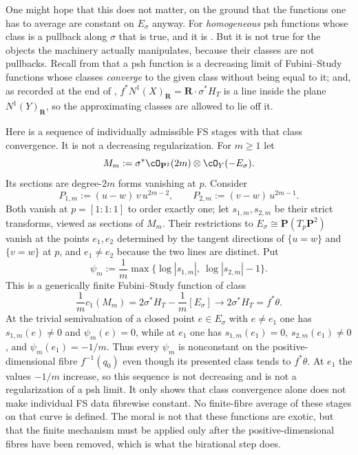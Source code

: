 \begin{example}
One might hope that this does not matter, on the ground that the functions
one has to average are constant on $E_\sigma$ anyway.  For
\emph{homogeneous} psh functions whose class is a pullback along $\sigma$
that is true, and it is .  But it is not true
for the objects the machinery actually manipulates, because their classes
are not pullbacks.  Recall from  that a psh function is a
decreasing limit of Fubini--Study functions whose classes \emph{converge} to
the given class without being equal to it; and, as recorded at the end of
, $f^*N^1(X)_{\mathbf R}=\mathbf R\cdot\sigma^*H_T$
is a line inside the plane $N^1(Y)_{\mathbf R}$, so the approximating
classes are allowed to lie off it.

Here is a sequence of individually admissible FS stages with that
class convergence.  It is not a decreasing regularization.  For $m\ge1$
let
\[
 M_m:=\sigma^*\cO_{\mathbf P^2}(2m)\otimes\cO_Y(-E_\sigma).
\]
Its sections are degree-$2m$ forms vanishing at $p$.  Consider
\[
 P_{1,m}:=(u-w)\,v\,u^{2m-2},
 \qquad
 P_{2,m}:=(v-w)\,u^{2m-1}.
\]
Both vanish at $p=[1:1:1]$ to order exactly one; let $s_{1,m},s_{2,m}$ be
their strict transforms, viewed as sections of $M_m$.  Their
restrictions to $E_\sigma\cong\mathbf P(T_p\mathbf P^2)$ vanish at the
points $e_1,e_2$ determined by the tangent directions of $\{u=w\}$ and
$\{v=w\}$ at $p$, and $e_1\ne e_2$ because the two lines are distinct.
Put
\[
 \psi_m:=\frac1m\max\bigl\{\log|s_{1,m}|,\
                              \log|s_{2,m}|-1\bigr\}.
\]
This is a generically finite Fubini--Study function of class
\[
 \frac1m c_1(M_m)=2\sigma^*H_T-\frac1m[E_\sigma]
 \longrightarrow 2\sigma^*H_T=f^*\theta.
\]
At the trivial semivaluation of a closed point $e\in E_\sigma$ with
$e\ne e_1$ one has $s_{1,m}(e)\ne0$ and $\psi_m(e)=0$, while at
$e_1$ one has $s_{1,m}(e_1)=0$, $s_{2,m}(e_1)\ne0$, and
$\psi_m(e_1)=-1/m$.  Thus every $\psi_m$ is nonconstant on the
positive-dimensional fibre $f^{-1}(q_0)$ even though its presented
class tends to $f^*\theta$.  At $e_1$ the values $-1/m$ increase,
so this sequence is not decreasing and is not a regularization of
a psh limit.  It only shows that class convergence alone does not
make individual FS data fibrewise constant.
No finite-fibre average of these stages on that curve is defined.  The moral
is not that these functions are exotic, but that the finite mechanism must
be applied only after the positive-dimensional fibres have been removed,
which is what the birational step does.


\end{example}
